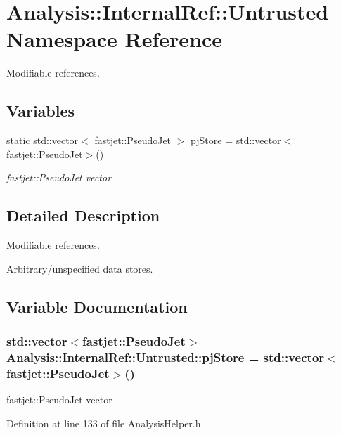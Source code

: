 \hypertarget{namespaceAnalysis_1_1InternalRef_1_1Untrusted}{}\section{Analysis\+:\+:Internal\+Ref\+:\+:Untrusted Namespace Reference}
\label{namespaceAnalysis_1_1InternalRef_1_1Untrusted}


Modifiable references.  


\subsection*{Variables}
\begin{DoxyCompactItemize}
\item 
static std\+::vector$<$ fastjet\+::\+Pseudo\+Jet $>$ \hyperlink{namespaceAnalysis_1_1InternalRef_1_1Untrusted_af67827e0785b8a3fc082a287e1a03f14}{pj\+Store} = std\+::vector$<$fastjet\+::\+Pseudo\+Jet$>$()
\begin{DoxyCompactList}\small\item\em {\ttfamily fastjet\+::\+Pseudo\+Jet} vector \end{DoxyCompactList}\end{DoxyCompactItemize}


\subsection{Detailed Description}
Modifiable references. 

Arbitrary/unspecified data stores. 

\subsection{Variable Documentation}
\subsubsection[{\texorpdfstring{pj\+Store}{pjStore}}]{\setlength{\rightskip}{0pt plus 5cm}std\+::vector$<$fastjet\+::\+Pseudo\+Jet$>$ Analysis\+::\+Internal\+Ref\+::\+Untrusted\+::pj\+Store = std\+::vector$<$fastjet\+::\+Pseudo\+Jet$>$()\hspace{0.3cm}{\ttfamily [static]}}\hypertarget{namespaceAnalysis_1_1InternalRef_1_1Untrusted_af67827e0785b8a3fc082a287e1a03f14}{}\label{namespaceAnalysis_1_1InternalRef_1_1Untrusted_af67827e0785b8a3fc082a287e1a03f14}


{\ttfamily fastjet\+::\+Pseudo\+Jet} vector 



Definition at line 133 of file Analysis\+Helper.\+h.

